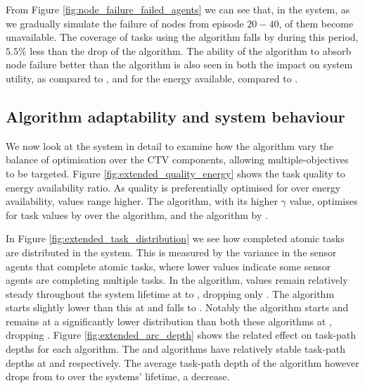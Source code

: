 From Figure \ref{fig:node_failure_failed_agents} we can see that, in the \simulationNodeFailure{}{} system, as we gradually simulate the failure of nodes from episode $20-40$,  \resultsNodeFailureFailedAgentsBalancedDiff{}{} of them become unavailable. The coverage  of tasks using the \algorithmBalanced{}{} algorithm falls by \resultsNodeFailureCoverageBalancedDiff{}{} during this period, $5.5\%$ less than the \resultsNodeFailureCoverageQRoutingDiff{}{} drop of the \algorithmQRouting{}{} algorithm. The ability of the \algorithmBalanced{}{} algorithm to absorb node failure better than the \algorithmQRouting{}{} algorithm is also seen in both the impact on system utility, \resultsNodeFailureCTVBalancedImpactDiff{}{} as compared to \resultsNodeFailureCTVQRoutingImpactDiff{}{}, and for the energy available, \resultsNodeFailureCTVBalancedImpactDiff{}{} compared to \resultsNodeFailureCTVQRoutingImpactDiff{}{}.


\subsection{Algorithm adaptability and system behaviour}

We now look at the \simulationExtended{}{} system in detail to examine how the algorithm vary the balance  of optimisation over the CTV components, allowing multiple-objectives to be targeted. Figure 	\ref{fig:extended_quality_energy} shows the task quality to energy availability ratio. 
As quality is preferentially optimised for over energy availability, values range higher. The \algorithmQuality{}{} algorithm, with its higher $\gamma$ value, optimises for task values by \resultsQEQualityEnd{}{} over the \algorithmEnergy{}{} algorithm, and the \algorithmDistribution{}{} algorithm by \resultsQEDistDiff{}{}. 

In Figure \ref{fig:extended_task_distribution} we see how completed atomic tasks are distributed in the system. This is measured by the variance in the sensor agents that complete atomic tasks, where lower values indicate some sensor agents are completing multiple tasks. In the \algorithmDistribution{}{} algorithm, values remain relatively steady throughout the system lifetime at \resultsTaskDistDistStart{}{} to \resultsTaskDistDistEnd{}{}, dropping only \resultsTaskDistDistPercent{}{}. The \algorithmQuality{}{} algorithm starts slightly lower than this at \resultsTaskDistQualityStart{}{} and falls \resultsTaskDistQualityPercent{}{} to \resultsTaskDistQualityEnd{}{}. Notably the \algorithmEnergy{}{} algorithm starts and remains at a significantly lower distribution than both these algorithms at \resultsTaskDistEnergyEnd{}{}, dropping \resultsTaskDistEnergydPercent{}{}. Figure
\ref{fig:extended_arc_depth} shows the related effect on task-path depths for each algorithm. The \algorithmQuality{}{} and \algorithmDistribution{}{} algorithms have relatively stable task-path depths at \resultsArcDepthQualityEnd{}{} and \resultsArcDepthDistEnd{}{} respectively. The average task-path depth of the \algorithmEnergy{}{} algorithm however drops from \resultsArcDepthEnergyStart{}{} to  \resultsArcDepthEnergyEnd{}{} over the systems' lifetime, a \resultsArcDepthEnergyPercent{}{} decrease.

